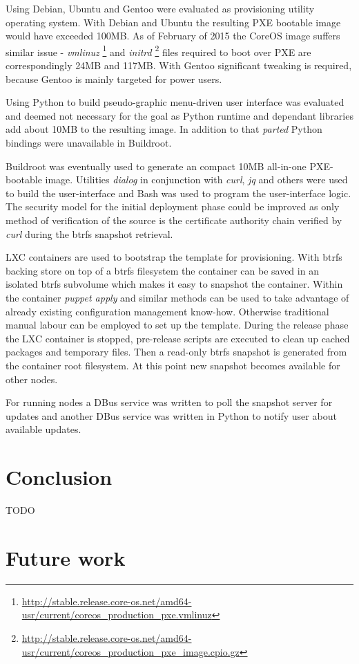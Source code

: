 \documentclass{article}
\begin{document}
Using Debian, Ubuntu and Gentoo were evaluated as provisioning utility operating system. With Debian and Ubuntu the resulting PXE bootable image would have exceeded 100MB. As of February of 2015 the CoreOS image suffers similar issue - \emph{vmlinuz} \footnote{\url{http://stable.release.core-os.net/amd64-usr/current/coreos_production_pxe.vmlinuz}} and \emph{initrd} \footnote{\url{http://stable.release.core-os.net/amd64-usr/current/coreos_production_pxe_image.cpio.gz}} files required to boot over PXE are correspondingly 24MB and 117MB. With Gentoo significant tweaking is required, because Gentoo is mainly targeted for power users.

Using Python to build pseudo-graphic menu-driven user interface was evaluated and deemed not necessary for the goal as Python runtime and dependant libraries add about 10MB to the resulting image. In addition to that \emph{parted} Python bindings were unavailable in Buildroot. 

Buildroot was eventually used to generate an compact 10MB all-in-one PXE-bootable image. Utilities \emph{dialog} in conjunction with \emph{curl}, \emph{jq} and others were used to build the user-interface and Bash was used to program the user-interface logic. The security model for the initial deployment phase could be improved as only method of verification of the source is the certificate authority chain verified by \emph{curl} during the btrfs snapshot retrieval.

LXC containers are used to bootstrap the template for provisioning. With btrfs backing store on top of a btrfs filesystem the container can be saved in an isolated btrfs subvolume which makes it easy to snapshot the container. Within the container \emph{puppet apply} and similar methods can be used to take advantage of already existing configuration management know-how. Otherwise traditional manual labour can be employed to set up the template. During the release phase the LXC container is stopped, pre-release scripts are executed to clean up cached packages and temporary files. Then a read-only btrfs snapshot is generated from the container root filesystem. At this point new snapshot becomes available for other nodes.

For running nodes a DBus service was written to poll the snapshot server for updates and another DBus service was written in Python to notify user about available updates.


\section{Conclusion}

TODO

\section{Future work}



\end{document}
